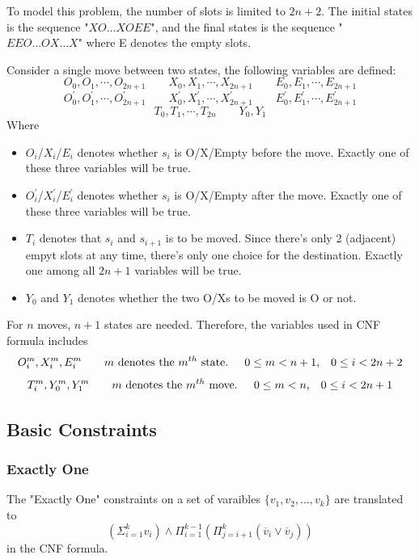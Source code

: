 \documentclass{article}
\begin{document}
    To model this problem, the number of slots is limited to $2n+2$.
    The initial states is the sequence "$XO\dots XOEE$",
    and the final states is the sequence "$EEO\dots OX\dots X$" where E denotes the 
    empty slots.

    Consider a single move between two states, the following variables are defined:
        $$O_0, O_1, \cdots, O_{2n+1}\qquad
        X_0, X_1, \cdots, X_{2n+1}\qquad
        E_0, E_1, \cdots, E_{2n+1}$$
        $$O_0^\prime, O_1^\prime, \cdots, O_{2n+1}^\prime\qquad
        X_0^\prime, X_1^\prime, \cdots, X_{2n+1}^\prime\qquad
        E_0^\prime, E_1^\prime, \cdots, E_{2n+1}^\prime$$
        $$T_0, T_1,\cdots, T_{2n}\qquad Y_0, Y_1$$
    Where
    \begin{itemize}
        \item $O_i$/$X_i$/$E_i$ denotes whether $s_i$ is O/X/Empty before the move.
            Exactly one of these three variables will be true.
        \item $O_i^\prime$/$X_i^\prime$/$E_i^\prime$ denotes whether $s_i$ is O/X/Empty after the move.
            Exactly one of these three variables will be true.
        \item $T_i$ denotes that $s_i$ and $s_{i+1}$ is to be moved.
            Since there's only 2 (adjacent) empyt slots at any time,
            there's only one choice for the destination. 
            Exactly one among all $2n+1$ variables will be true.
        \item $Y_0$ and $Y_1$ denotes whether the two O/Xs to be moved is O or not.
    \end{itemize}

    For $n$ moves, $n+1$ states are needed.  
    Therefore, the variables used in CNF formula includes
    $$O_i^m,X_i^m,E_i^m \qquad 
    \text{$m$ denotes the $m^{th}$ state. \quad$0\leq m < n+1$,\quad$0\leq i < 2n+2$}$$
    $$T_i^m, Y_0^m, Y_1^m \qquad
    \text{$m$ denotes the $m^{th}$ move. \quad$0\leq m < n$,\quad $0\leq i < 2n+1$}$$ 

    \subsection{Basic Constraints}

        \subsubsection{Exactly One}
            
        The "Exactly One" constraints on a set of varaibles
        $\{v_1, v_2,\dots, v_k\}$ are translated to
        $$
        (\Sigma_{i=1}^{k}v_i) \land
        \Pi_{i=1}^{k-1}
        ( \Pi_{j=i+1}^{k} ( \overline v_i \lor \overline v_j ) )$$
        in the CNF formula.
\end{document}
